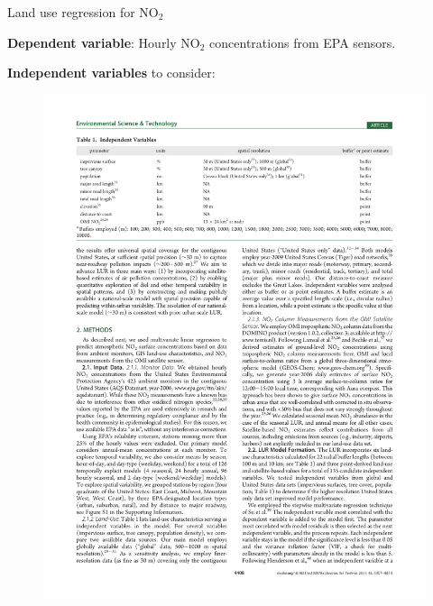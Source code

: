 \documentclass[aspectratio=169, handout]{beamer}
\begin{document}
\begin{frame}{Land use regression for NO$_2$}

\textbf{Dependent variable}: Hourly NO$_2$ concentrations from EPA sensors.

\vspace{3mm}
\textbf{Independent variables} to consider:
\vspace{-5mm}
\begin{figure}
\includegraphics[height=0.6\textheight]{novotny_tab1_1}

\end{figure}
\end{frame}
\end{document}
